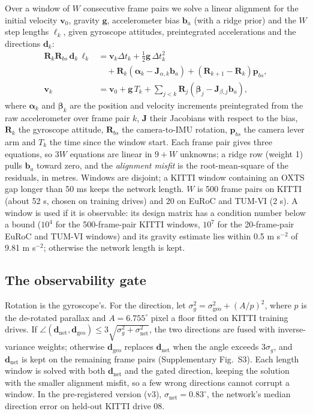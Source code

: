\documentclass[pdflatex,sn-nature]{sn-jnl}
\newcommand{\dnet}{\mathbf{d}_{\mathrm{net}}}
\newcommand{\dgeo}{\mathbf{d}_{\mathrm{geo}}}
\begin{document}
Over a window of $W$ consecutive frame pairs we solve a linear alignment\cite{Qin2017} for the initial velocity $\mathbf v_0$, gravity $\mathbf g$, accelerometer bias $\mathbf b_a$ (with a ridge prior) and the $W$ step lengths $\ell_k$, given gyroscope attitudes, preintegrated accelerations and the directions $\mathbf d_k$:
\begin{align}
\mathbf R_k\mathbf R_{bs}\,\mathbf d_k\,\ell_k &= \mathbf v_k\Delta t_k+\tfrac12\mathbf g\,\Delta t_k^2\nonumber\\
&\quad+\mathbf R_k(\boldsymbol\alpha_k-\mathbf J_{\alpha,k}\mathbf b_a)+(\mathbf R_{k+1}-\mathbf R_k)\mathbf p_{bs},\label{eq:align}\\
\mathbf v_k &= \mathbf v_0+\mathbf g\,T_k+\textstyle\sum_{j<k}\mathbf R_j(\boldsymbol\beta_j-\mathbf J_{\beta,j}\mathbf b_a),\nonumber
\end{align}
where $\boldsymbol\alpha_k$ and $\boldsymbol\beta_k$ are the position and velocity increments preintegrated from the raw accelerometer over frame pair $k$, $\mathbf J$ their Jacobians with respect to the bias, $\mathbf R_k$ the gyroscope attitude, $\mathbf R_{bs}$ the camera-to-IMU rotation, $\mathbf p_{bs}$ the camera lever arm and $T_k$ the time since the window start. Each frame pair gives three equations, so $3W$ equations are linear in $9+W$ unknowns; a ridge row (weight 1) pulls $\mathbf b_a$ toward zero, and the \emph{alignment misfit} is the root-mean-square of the residuals, in metres. Windows are disjoint; a KITTI window containing an OXTS gap longer than 50 ms keeps the network length. $W$ is 500 frame pairs on KITTI (about 52 s, chosen on training drives) and 20 on EuRoC and TUM-VI (2 s). A window is used if it is observable: its design matrix has a condition number below a bound ($10^4$ for the 500-frame-pair KITTI windows, $10^7$ for the 20-frame-pair EuRoC and TUM-VI windows) and its gravity estimate lies within 0.5 m s$^{-2}$ of 9.81 m s$^{-2}$; otherwise the network length is kept.

\subsection{The observability gate}

Rotation is the gyroscope's. For the direction, let $\sigma_g^2=\sigma_\mathrm{geo}^2+(A/p)^2$, where $p$ is the de-rotated parallax and $A=6.755^\circ$ pixel a floor fitted on KITTI training drives. If $\angle(\dnet,\dgeo)\le 3\sqrt{\sigma_g^2+\sigma_\mathrm{net}^2}$, the two directions are fused with inverse-variance weights; otherwise $\dgeo$ replaces $\dnet$ when the angle exceeds $3\sigma_g$, and $\dnet$ is kept on the remaining frame pairs (Supplementary Fig.~S3). Each length window is solved with both $\dnet$ and the gated direction, keeping the solution with the smaller alignment misfit, so a few wrong directions cannot corrupt a window. In the pre-registered version (v3), $\sigma_\mathrm{net}=0.83^\circ$, the network's median direction error on held-out KITTI drive 08.
\end{document}
